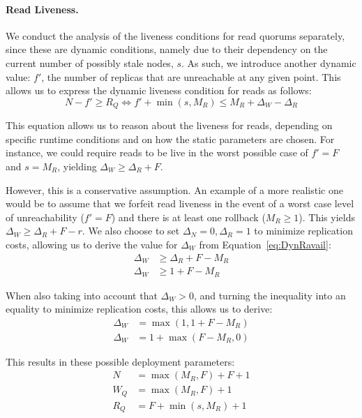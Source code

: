 \paragraph{Read Liveness.}
We conduct the analysis of the liveness conditions for read
quorums separately, since these are dynamic conditions, namely
due to their dependency on the current number of possibly stale
nodes, $s$.  As such, we introduce another dynamic value: $f'$,
the number of replicas that are unreachable at any given point.
This allows us to express the dynamic liveness condition for
reads as follows:
\begin{equation} \label{eq:DynRavail}
    N - f' \geq R_Q  \Leftrightarrow f' + \min(s, M_R) \leq M_R + \Delta_W - \Delta_R
\end{equation}

This equation allows us to reason about the liveness for reads,
depending on specific runtime conditions and on how the static
parameters are chosen. For instance, we could require reads to be
live in the worst possible case of $f' = F$ and $s = M_R$, yielding
$\Delta_W \geq \Delta_R + F$.

However, this is a conservative assumption. An example of a more
realistic one would be to assume that we forfeit read liveness in
the event of a worst case level of unreachability ($f' = F$) and
there is at least one rollback ($M_R \geq 1$). This yields
$\Delta_W \geq \Delta_R + F - r$. We also choose to set
$\Delta_N=0,\Delta_R=1$ to minimize replication costs, allowing
us to derive the value for $\Delta_W$ from
Equation~\ref{eq:DynRavail}:
\begin{align} \label{eq:deployment1}
  \Delta_W &\geq  \Delta_R + F - M_R\\
  \Delta_W &\geq  1 + F - M_R
\end{align}

When also taking into account that $\Delta_W > 0$, and turning
the inequality into an equality to minimize replication costs,
this allows us to derive:
\begin{align} \label{eq:deployment2}
  \Delta_W &=  \max(1,1 + F - M_R)\\
  \Delta_W &=  1 + \max(F - M_R,0)
\end{align}

This results in these possible deployment parameters:
\begin{align} \label{eq:deploymentfinal}
    N &= \max(M_R, F) + F + 1  \\
    W_Q &= \max(M_R, F) + 1 \\
    R_Q &= F + \min(s, M_R) + 1 \label{eq:proof3}
\end{align}

